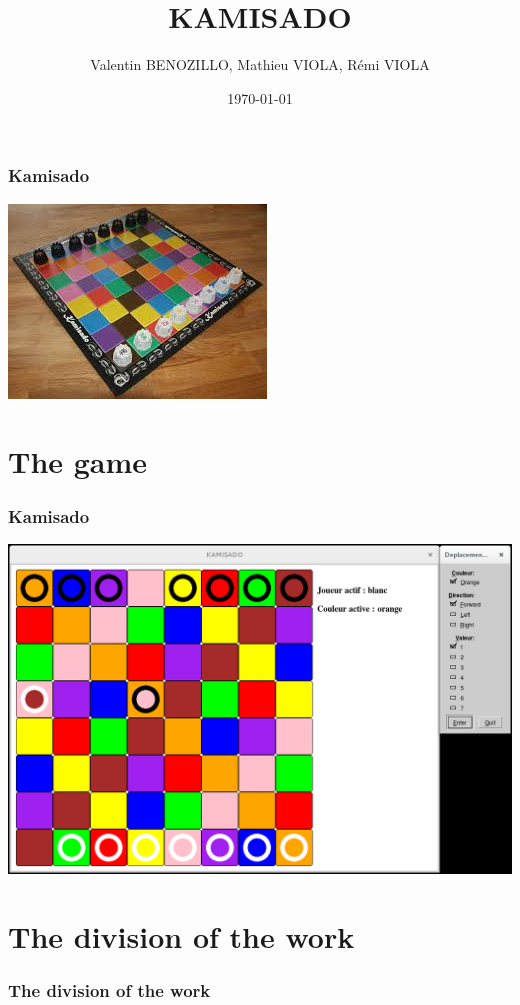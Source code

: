 \documentclass[a4paper, 11pt]{beamer}
\title{KAMISADO}
\author{Valentin BENOZILLO, Mathieu VIOLA, Rémi VIOLA}
\date{\today}
\begin{document}
\begin{frame}
\titlepage
\end{frame}

\begin{frame}
\tableofcontents
\end{frame}

\begin{frame}
\frametitle{Kamisado}
\begin{center}
\includegraphics[scale = 0.07]{kamisado.jpeg}
\end{center}
\end{frame}

\section{The game}
\begin{frame}
\frametitle{Kamisado}
\begin{center}
\includegraphics[scale = 0.25]{kamisado.png}
\end{center}
\end{frame}

\section{The division of the work}
\begin{frame}
\frametitle{The division of the work}

\end{frame}
\end{document}
